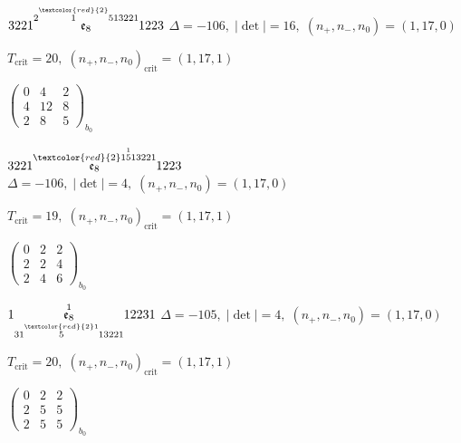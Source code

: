 \documentclass[10pt]{article}
\begin{document}
\smallskip

$3221\overset{2\overset{\textcolor{red}{2}}{1}513221}{\mathfrak{e}_8}1223$ \quad $\Delta=-106,\; |\det|=16,\; (n_+,n_-,n_0)=(1,17,0)$

\hspace{1em}$T_{\text{crit}}=20,\; (n_+,n_-,n_0)_{\text{crit}}=(1,17,1)$

\hspace{2em}$\left(\begin{smallmatrix}0 & 4 & 2 \\ 4 & 12 & 8 \\ 2 & 8 & 5\end{smallmatrix}\right)_{\!b_0}$

\smallskip

$3221\overset{\textcolor{red}{2}1\overset{1}{5}13221}{\mathfrak{e}_8}1223$ \quad $\Delta=-106,\; |\det|=4,\; (n_+,n_-,n_0)=(1,17,0)$

\hspace{1em}$T_{\text{crit}}=19,\; (n_+,n_-,n_0)_{\text{crit}}=(1,17,1)$

\hspace{2em}$\left(\begin{smallmatrix}0 & 2 & 2 \\ 2 & 2 & 4 \\ 2 & 4 & 6\end{smallmatrix}\right)_{\!b_0}$

\smallskip

$1\overset{1}{\underset{31\overset{\textcolor{red}{2}1}{5}13221}{\mathfrak{e}_8}}12231$ \quad $\Delta=-105,\; |\det|=4,\; (n_+,n_-,n_0)=(1,17,0)$

\hspace{1em}$T_{\text{crit}}=20,\; (n_+,n_-,n_0)_{\text{crit}}=(1,17,1)$

\hspace{2em}$\left(\begin{smallmatrix}0 & 2 & 2 \\ 2 & 5 & 5 \\ 2 & 5 & 5\end{smallmatrix}\right)_{\!b_0}$

\smallskip
\end{document}
